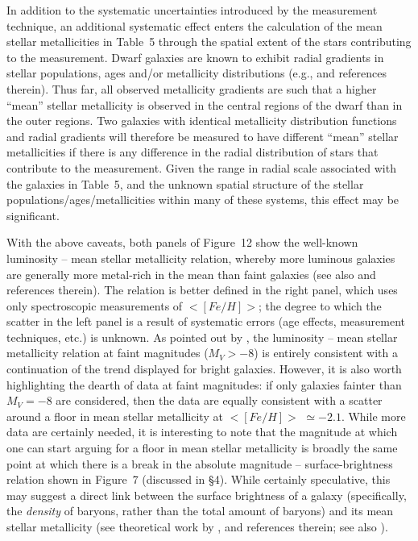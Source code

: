 \documentclass[manuscript]{aastex}
\begin{document}
In addition to the systematic uncertainties introduced by the
measurement technique, an additional systematic effect enters the
calculation of the mean stellar metallicities in Table~5 through the
spatial extent of the stars contributing to the measurement. Dwarf
galaxies are known to exhibit radial gradients in stellar populations,
ages and/or metallicity distributions (e.g.,
\citealt{harbeck2001,tolstoy2004,battaglia2006,bernard2008} and
references therein). Thus far, all observed metallicity gradients are such that a
higher ``mean'' stellar metallicity is observed in the central regions
of the dwarf than in the outer regions. Two galaxies with identical
metallicity distribution functions and radial gradients will therefore
be measured to have different ``mean'' stellar metallicities if there
is any difference in the radial distribution of stars that contribute
to the measurement. Given the range in radial scale associated with
the galaxies in Table~5, and the unknown spatial structure of the
stellar populations/ages/metallicities within many of these systems,
this effect may be significant.

With the above caveats, both panels of Figure~12 show the well-known
luminosity -- mean stellar metallicity relation, whereby more luminous
galaxies are generally more metal-rich in the mean than faint galaxies
(see also \cite{tremonti2004,lee2006,kirby2008b} and references
therein). The relation is better defined in the right panel, which
uses only spectroscopic measurements of $<[Fe/H]>$; the degree to
which the scatter in the left panel is a result of systematic errors
(age effects, measurement techniques, etc.) is unknown. As pointed out
by \cite{kirby2008b}, the luminosity -- mean stellar metallicity
relation at faint magnitudes ($M_V > -8$) is entirely consistent with
a continuation of the trend displayed for bright galaxies. However, it
is also worth highlighting the dearth of data at faint magnitudes: if
only galaxies fainter than $M_V = -8$ are considered, then the data
are equally consistent with a scatter around a floor in mean stellar
metallicity at $<[Fe/H]>$ $\simeq -2.1$. While more data are certainly
needed, it is interesting to note that the magnitude at which one can
start arguing for a floor in mean stellar metallicity is broadly the
same point at which there is a break in the absolute magnitude --
surface-brightness relation shown in Figure~7  (discussed in
\S4). While certainly speculative, this may suggest a direct link
between the surface brightness of a galaxy (specifically, the {\it
  density} of baryons, rather than the total amount of baryons) and
its mean stellar metallicity (see theoretical work by \cite{dekel2003},
\cite{revaz2012} and references therein; see also
\citealt{skillman2003b}).
\end{document}
